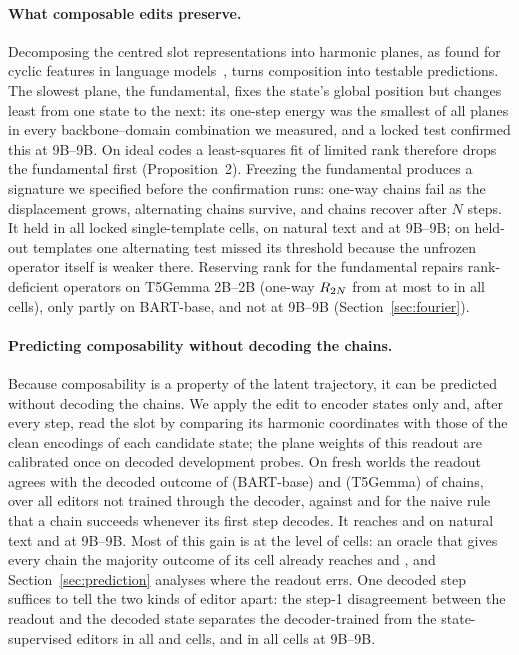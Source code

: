 \paragraph{What composable edits preserve.}
%
Decomposing the centred slot representations into harmonic planes, as found for cyclic features in language
models~\citep{engels2025notall,karkada2026symmetries}, turns composition into testable predictions. The slowest plane, the fundamental,
fixes the state's global position but changes least from one state to the next: its one-step energy was the smallest of all planes in
every backbone--domain combination we measured, and a locked test confirmed this at 9B--9B. On ideal codes a least-squares fit of limited
rank therefore drops the fundamental first (Proposition~2). Freezing the fundamental produces a signature we specified before the
confirmation runs: one-way chains fail as the displacement grows, alternating chains survive, and chains recover after $N$ steps. It
held in all \CLfiveVoneN{} locked single-template cells, on natural text and at 9B--9B; on held-out templates one alternating test
missed its threshold because the unfrozen operator itself is weaker there. Reserving rank for the fundamental repairs rank-deficient
operators on T5Gemma 2B--2B (one-way $R_{2N}$ from at most \CLtenRRRMax{} to \CLtenFFMin{} in all \CLtenCells{} cells), only partly
on BART-base, and not at 9B--9B (Section~\ref{sec:fourier}).

\paragraph{Predicting composability without decoding the chains.}
%
Because composability is a property of the latent trajectory, it can be predicted without decoding the chains. We apply the edit to
encoder states only and, after every step, read the slot by comparing its harmonic coordinates with those of the clean encodings of
each candidate state; the plane weights of this readout are calibrated once on decoded development probes. On fresh worlds the readout
agrees with the decoded outcome of \CLeightAgreeBart{} (BART-base) and \CLeightAgreeTfive{} (T5Gemma) of chains, over all editors not
trained through the decoder, against \CLeightNaiveBart{} and \CLeightNaiveTfive{} for the naive rule that a chain succeeds whenever
its first step decodes. It reaches \CLseventeenAgreeBart{} and \CLseventeenAgreeTfive{} on natural text and \CLeighteenAgree{} at
9B--9B. Most of this gain is at the level of cells: an oracle that gives every chain the majority outcome of its cell already reaches
\CLeightMajBart{} and \CLeightMajTfive{}, and Section~\ref{sec:prediction} analyses where the readout errs. One decoded step suffices to
tell the two kinds of editor apart: the step-1 disagreement between the readout and the decoded state separates the decoder-trained from
the state-supervised editors in all \CLnineCE{} and \CLnineState{} cells, and in all \CLeighteenDsepCells{} cells at 9B--9B.

